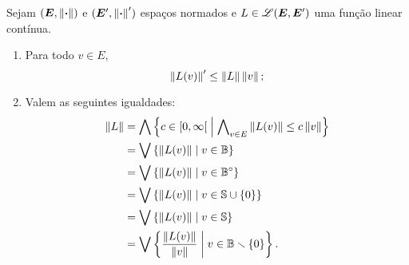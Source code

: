 

\begin{exercise}
Sejam $(\bm E,\nor{\var})$ e $(\bm E',\nor{\var}')$ espaços normados e $L \in \toplin(\bm E, \bm E')$ uma função linear contínua.
	\begin{enumerate}
	\item Para todo $v \in E$,
		\begin{equation*}
		\nor{L(v)}' \leq \nor{L}\nor{v};
		\end{equation*}

	\item Valem as seguintes igualdades:
		\begin{align*}
		\nor{L} &= \inf\set{c \in \intfa{0}{\infty}}{\forall_{v \in E} \nor{L(v)} \leq c\nor{v}} \\
			&= \sup \set{\nor{L(v)}}{v \in \B} \\
			&= \sup \set{\nor{L(v)}}{v \in \Int{\B}} \\
			&= \sup \set{\nor{L(v)}}{v \in \S \cup \{0\}} \\
			&= \sup\set{\nor{L(v)}}{v \in \S} \\
			&= \sup \set{\frac{\nor{L(v)}}{\nor{v}}}{v \in \B \setminus \{0\}}.
		\end{align*}
	\end{enumerate}
\end{exercise}
%


